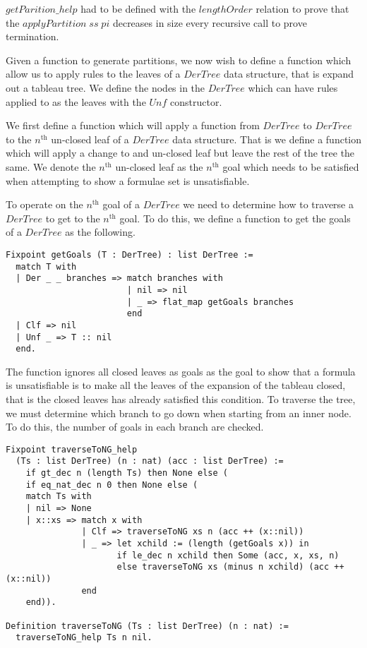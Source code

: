 $getParition\_help$ had to be defined with the $lengthOrder$ relation to prove
that the $applyPartition \; ss \; pi$ decreases in size every recursive call to
prove termination.

Given a function to generate partitions, we now wish to define a function which
allow us to apply rules to the leaves of a $DerTree$ data structure, that is
expand out a tableau tree. We define the nodes in the $DerTree$ which can have
rules applied to as the leaves with the $Unf$ constructor.

We first define a function which will apply a function from $DerTree$ to
$DerTree$ to the $n^{\text{th}}$ un-closed leaf of a $DerTree$ data structure. 
That is we define a function which will apply a change to and un-closed leaf
but leave the rest of the tree the same. We denote the $n^{\text{th}}$
un-closed leaf as the $n^{\text{th}}$ goal which needs to be satisfied when
attempting to show a formulae set is unsatisfiable. 

To operate on the $n^{\text{th}}$ goal of a $DerTree$ we need to determine
how to traverse a $DerTree$ to get to the $n^{\text{th}}$ goal. To do this, we
define a function to get the goals of a $DerTree$ as the following.

\begin{lstlisting}
Fixpoint getGoals (T : DerTree) : list DerTree :=
  match T with
  | Der _ _ branches => match branches with
                        | nil => nil
                        | _ => flat_map getGoals branches
                        end
  | Clf => nil
  | Unf _ => T :: nil
  end.
\end{lstlisting}

The function ignores all closed leaves as goals as the goal to show that a
formula is unsatisfiable is to make all the leaves of the expansion of the
tableau closed, that is the closed leaves has already satisfied this
condition. To traverse the tree, we must determine which branch to go down when
starting from an inner node. To do this, the number of goals in each branch are
checked.

\begin{lstlisting}
Fixpoint traverseToNG_help
  (Ts : list DerTree) (n : nat) (acc : list DerTree) :=
    if gt_dec n (length Ts) then None else (
    if eq_nat_dec n 0 then None else (
    match Ts with
    | nil => None
    | x::xs => match x with
               | Clf => traverseToNG xs n (acc ++ (x::nil))
               | _ => let xchild := (length (getGoals x)) in
                      if le_dec n xchild then Some (acc, x, xs, n)
                      else traverseToNG xs (minus n xchild) (acc ++ (x::nil))
               end
    end)).

Definition traverseToNG (Ts : list DerTree) (n : nat) :=
  traverseToNG_help Ts n nil.
\end{lstlisting}

